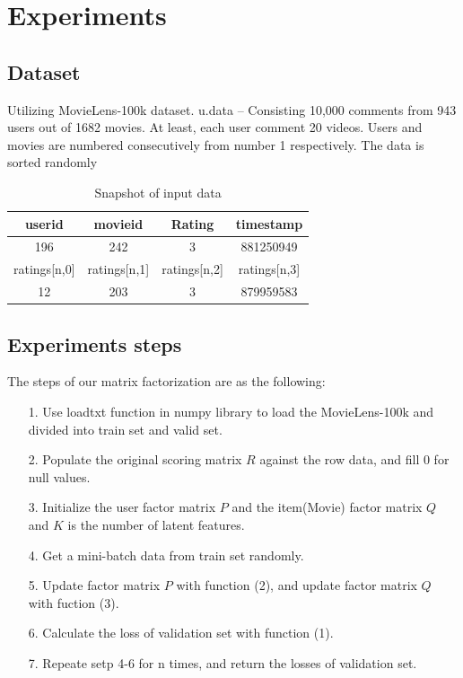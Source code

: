 \documentclass[journal, a4paper]{IEEEtran}
\begin{document}
\section{Experiments}
\subsection{Dataset}
Utilizing MovieLens-100k dataset. u.data -- Consisting 10,000 comments from 943 users out of 1682 movies. At least, each user comment 20 videos. Users and movies are numbered consecutively from number 1 respectively. The data is sorted randomly

\begin{table}[!htb]
	\begin{center}
	\caption{Snapshot of input data}
	\label{tab:closed form}
	\begin{tabular}{|c|c|c|c|}
		\hline
		userid &  movieid & Rating & timestamp\\
		\hline
		196 & 242 & 3 &  881250949\\
		\hline
		ratings[n,0] & ratings[n,1] & ratings[n,2] & ratings[n,3] \\
		\hline
		12 & 203 & 3 &  879959583\\
		\hline
	\end{tabular}
	\end{center}
\end{table}

\subsection{Experiments steps}
The steps of our matrix factorization are as the following:
\begin{itemize}
\item[1.] Use loadtxt function in numpy library to load the MovieLens-100k and divided into train set and valid set.
\item[2.] Populate the original scoring matrix $R$ against the row data, and fill 0 for null values.
\item[3.]Initialize the user factor matrix $P$ and the item(Movie) factor matrix $Q$ and $K$ is the number of latent features.
\item[4.] Get a mini-batch data from train set randomly.
\item[5.] Update factor matrix $P$ with function (2), and update factor matrix $Q$ with fuction (3).
\item[6.] Calculate the loss of validation set with function (1).
\item[7.] Repeate setp 4-6 for n times, and return the losses of validation set.
\end{itemize}
\end{document}
